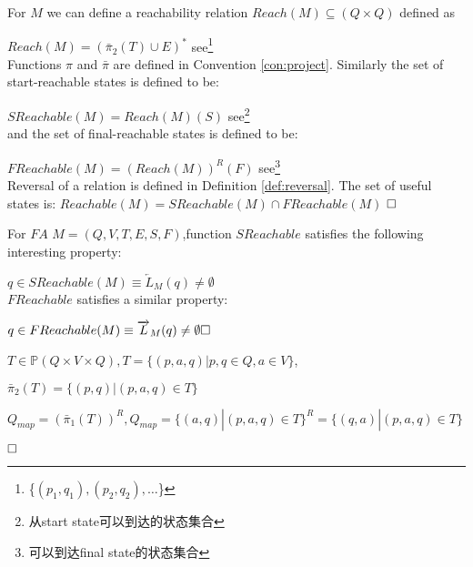 \begin{definition}
	For $M$ we can define a reachability relation $Reach(M)\subseteq (Q\times Q)$ defined as
	
	$Reach(M) = (\bar{\pi}_2(T)\cup E)^\ast$        see\footnote{\{$(p_1,q_1),(p_2,q_2),\dots$\}}\\
	Functions $\pi$ and $\bar{\pi}$ are defined in Convention \ref{con:project}. Similarly the set of start-reachable states is defined to be:
	
	$SReachable(M)=Reach(M)(S)$ see\footnote{从start state可以到达的状态集合}\\
	and the set of final-reachable states is defined to be:
	
	$FReachable(M)=(Reach(M))^R(F)$ see\footnote{可以到达final state的状态集合}\\
	Reversal of a relation is defined in Definition \ref{def:reversal}. The set of useful states is:
	$Reachable(M)=SReachable(M)\cap FReachable(M)$ $\hfill\square$
\end{definition}

\begin{remark} For $FA$ $M=(Q,V,T,E,S,F)$,function $SReachable$ satisfies the following interesting property:
	
	$q\in SReachable(M)\equiv\overleftarrow{L}_M(q)\ne\emptyset$\\
	$FReachable$ satisfies a similar property:
	
	$q\in FReachable(M)\equiv\overrightarrow{L}_M(q)\ne\emptyset\hfill\square$
\end{remark}

\begin{example} 
	$T\in \mathbb{P}(Q\times V\times Q), T = \{(p,a,q)|p,q\in Q,a\in V\}$,
	
	$\bar{\pi}_2(T) = \{(p,q)|(p,a,q)\in T \}$	
	
	$Q_{map} = (\bar{\pi}_1(T))^R, Q_{map} = \{(a,q)|(p,a,q) \in T\}^R = \{(q,a)|(p,a,q) \in T\}$
	
	
	$\hfill\square$
\end{example}



